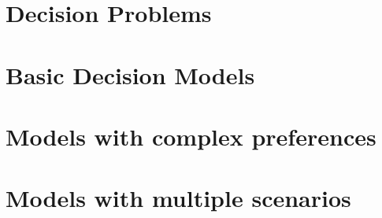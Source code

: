 \documentclass[11pt]{report}
\begin{document}
	\maketitle
	\tableofcontents
	\newpage	
	
	\part{Decision Problems}
	
	
	
	
	
	\part{Basic Decision Models}
	
	
	
	
	\part{Models with complex preferences}
	
	
	
	
	\part{Models with multiple scenarios}
	
	
	
\end{document}
